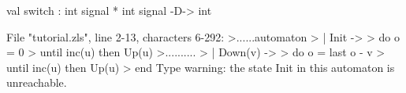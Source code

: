 \chklistingtrue
{}
\begin{ChkListingMsg}
val switch : int signal * int signal -D-> int
\end{ChkListingMsg}
\begin{ChkListingErr}
File "tutorial.zls", line 2-13, characters 6-292:
>......automaton
>      | Init ->
>          do o = 0
>          until inc(u) then Up(u)
>..........
>      | Down(v) ->
>          do o = last o - v
>          until inc(u) then Up(u)
>      end
Type warning: the state Init in this automaton is unreachable.
\end{ChkListingErr}
